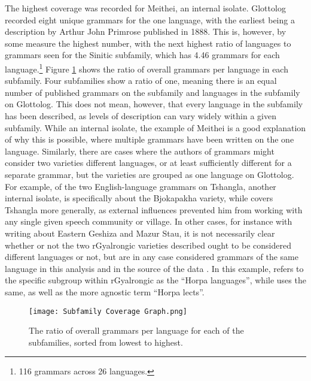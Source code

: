 The highest coverage was recorded for Meithei, an internal isolate. Glottolog recorded eight unique grammars for the one language, with the earliest being a description by Arthur John Primrose published in 1888\nocite{Primrose1888}. This is, however, by some measure the highest number, with the next highest ratio of languages to grammars seen for the Sinitic subfamily, which has 4.46 grammars for each language.\footnote{116 grammars across 26 languages.} Figure \ref{f:Description:SubfamilyCoverageGraph} shows the ratio of overall grammars per language in each subfamily. Four subfamilies show a ratio of one, meaning there is an equal number of published grammars on the subfamily and languages in the subfamily on Glottolog. This does not mean, however, that every language in the subfamily has been described, as levels of description can vary widely within a given subfamily. While an internal isolate, the example of Meithei is a good explanation of why this is possible, where multiple grammars have been written on the one language. Similarly, there are cases where the authors of grammars might consider two varieties different languages, or at least sufficiently different for a separate grammar, but the varieties are grouped as one language on Glottolog. For example, of the two English-language grammars on Tshangla, another internal isolate,  is specifically about the Bjokapakha variety, while  covers Tshangla more generally, as external influences prevented him from working with any single given speech community or village. In other cases, for instance with  writing about Eastern Geshiza and Mazur Stau, it is not necessarily clear whether or not the two rGyalrongic varieties described ought to be considered different languages or not, but are in any case considered grammars of the same language in this analysis and in the source of the data \cite{glottolog}. In this example,  refers to the specific subgroup within rGyalrongic as the ``Horpa languages'', while  uses the same, as well as the more agnostic term ``Horpa lects''.

\begin{figure}
        \centering
        \texttt{[image: Subfamily Coverage Graph.png]}
        \caption{The ratio of overall grammars per language for each of the subfamilies, sorted from lowest to highest.}\label{f:Description:SubfamilyCoverageGraph}
\end{figure}

